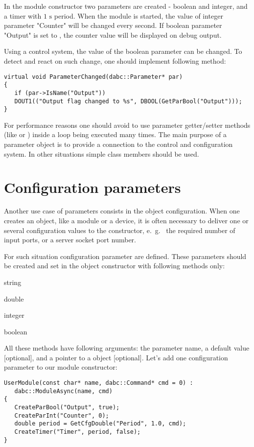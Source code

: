In the module constructor two parameters are created - boolean and integer, 
and a timer with $1\mbox{~s}$ period.
When the module is started, the value of integer parameter "Counter" 
will be changed every second.
If boolean parameter "Output" is set to , 
the counter value will be displayed on debug output.

Using a control system, the value of the boolean parameter can be changed. 
To detect and react on such change,
one should implement following method: 
 
\begin{verbatim}
virtual void ParameterChanged(dabc::Parameter* par) 
{
   if (par->IsName("Output")) 
   DOUT1(("Output flag changed to %s", DBOOL(GetParBool("Output")));
}
\end{verbatim}

For performance reasons one should avoid to use parameter getter/setter methods 
(like   or ) inside a loop 
being executed many times. The main purpose of a parameter
object is to provide a connection to the control and configuration system.
In other situations simple class members should be used.


\section{Configuration parameters}
\label{prog_setup_configurationparameter}
Another use case of parameters consists in the object configuration.
When one creates an object, like a module or a device, 
it is often necessary to deliver one or several configuration values 
to the constructor, e.~g.~ the required
number of input ports, or a server socket port number. 

For such situation configuration parameter are defined.
These parameters should be created and set 
in the object constructor with following methods only:


\bdes
\item[GetCfgStr]  string
\item[GetCfgDouble]   double 
\item[GetCfgInt]   integer
\item[GetCfgBool]   boolean 
\edes

All these methods have following arguments: the parameter name, 
a default value [optional], and a pointer to a  object [optional].
Let's add one configuration parameter to our module constructor:

\begin{small}
\begin{verbatim}
UserModule(const char* name, dabc::Command* cmd = 0) : 
   dabc::ModuleAsync(name, cmd)
{
   CreateParBool("Output", true);
   CreateParInt("Counter", 0);
   double period = GetCfgDouble("Period", 1.0, cmd);
   CreateTimer("Timer", period, false);
}
\end{verbatim}
\end{small}

